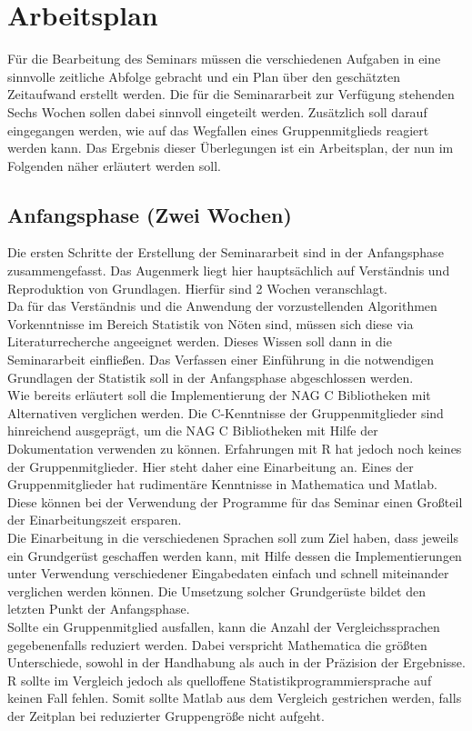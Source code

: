 \documentclass{article}
\begin{document}
\section{Arbeitsplan}
Für die Bearbeitung des Seminars müssen die verschiedenen Aufgaben in eine sinnvolle zeitliche Abfolge gebracht und ein Plan über den geschätzten Zeitaufwand erstellt werden.
Die für die Seminararbeit zur Verfügung stehenden Sechs Wochen sollen dabei sinnvoll eingeteilt werden.
Zusätzlich soll darauf eingegangen werden, wie auf das Wegfallen eines Gruppenmitglieds reagiert werden kann.
Das Ergebnis dieser Überlegungen ist ein Arbeitsplan, der nun im Folgenden näher erläutert werden soll.

\subsection{Anfangsphase (Zwei Wochen)}
Die ersten Schritte der Erstellung der Seminararbeit sind in der Anfangsphase zusammengefasst.
Das Augenmerk liegt hier hauptsächlich auf Verständnis und Reproduktion von Grundlagen.
Hierfür sind 2 Wochen veranschlagt.
\\
Da für das Verständnis und die Anwendung der vorzustellenden Algorithmen Vorkenntnisse im Bereich Statistik von Nöten sind, müssen sich diese via Literaturrecherche angeeignet werden.
Dieses Wissen soll dann in die Seminararbeit einfließen.
Das Verfassen einer Einführung in die notwendigen Grundlagen der Statistik soll in der Anfangsphase abgeschlossen werden.
\\
Wie bereits erläutert soll die Implementierung der NAG C Bibliotheken mit Alternativen verglichen werden.
Die C-Kenntnisse der Gruppenmitglieder sind hinreichend ausgeprägt, um die NAG C Bibliotheken mit Hilfe der Dokumentation verwenden zu können.
Erfahrungen mit R hat jedoch noch keines der Gruppenmitglieder.
Hier steht daher eine Einarbeitung an.
Eines der Gruppenmitglieder hat rudimentäre Kenntnisse in Mathematica und Matlab.
Diese können bei der Verwendung der Programme für das Seminar einen Großteil der Einarbeitungszeit ersparen.
\\
Die Einarbeitung in die verschiedenen Sprachen soll zum Ziel haben, dass jeweils ein Grundgerüst geschaffen werden kann, mit Hilfe dessen die Implementierungen unter Verwendung verschiedener Eingabedaten einfach und schnell miteinander verglichen werden können.
Die Umsetzung solcher Grundgerüste bildet den letzten Punkt der Anfangsphase.
\\
Sollte ein Gruppenmitglied ausfallen, kann die Anzahl der Vergleichssprachen gegebenenfalls reduziert werden.
Dabei verspricht Mathematica die größten Unterschiede, sowohl in der Handhabung als auch in der Präzision der Ergebnisse.
R sollte im Vergleich jedoch als quelloffene Statistikprogrammiersprache auf keinen Fall fehlen.
Somit sollte Matlab aus dem Vergleich gestrichen werden, falls der Zeitplan bei reduzierter Gruppengröße nicht aufgeht.
\end{document}
